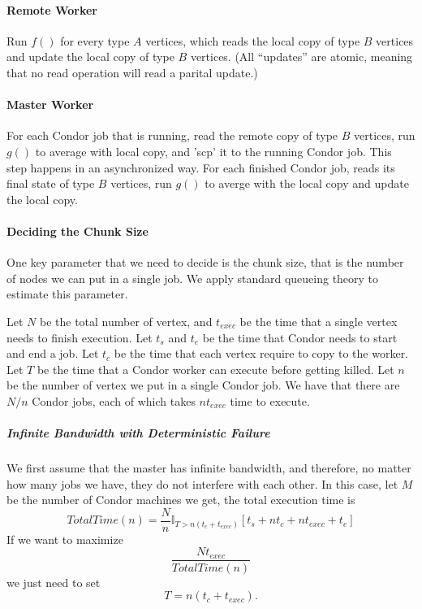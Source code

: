 \documentclass[11pt]{article}
\begin{document}
\paragraph{Remote Worker}
Run $f()$ for every type $A$ vertices, which reads the local copy of type $B$ 
vertices and update the local copy of type $B$ vertices. (All “updates” are 
atomic, meaning that no read operation will read a parital update.)
\paragraph{Master Worker}
For each Condor job that is running, read the remote copy of type $B$ vertices, 
run $g()$ to average with local copy, and 'scp' it to the running Condor job. 
This step happens in an asynchronized way. For each finished Condor job, reads 
its final state of type $B$ vertices, run $g()$ to averge with the local copy 
and update the local copy.\\

\paragraph*{Deciding the Chunk Size}

One key parameter that we need to decide is the
chunk size, that is the number of nodes we can
put in a single job. We apply standard queueing
theory to estimate this parameter. 

Let $N$ be the total number of vertex, and $t_{exec}$
be the time that a single vertex needs to
finish execution. Let $t_s$ and $t_e$ be the time
that Condor needs to start and end a job. Let
$t_c$ be the time that each vertex require to copy
to the worker.
Let $T$ be the time that a Condor worker can execute
before getting killed. Let $n$ be the number of 
vertex we put in a single Condor job.
%
We have that there are $N/n$ Condor jobs, each of which
takes $nt_{exec}$ time to execute. 

\subparagraph*{Infinite Bandwidth with Deterministic Failure}

We first assume that the master has infinite bandwidth,
and therefore, no matter how many jobs we have, they
do not interfere with each other. In this case, let
$M$ be the number of Condor machines we get, the
total execution time is
\[
TotalTime(n) = \frac{N}{n} \mathbb{I}_{T>n(t_c+t_{exec})} \left[ t_s + nt_c + nt_{exec}  + t_e \right]
\]
If we want to maximize
\[
\frac{Nt_{exec}}{TotalTime(n)}
\]
we just need to set
\[
T=n(t_c+t_{exec}).
\]
\end{document}
